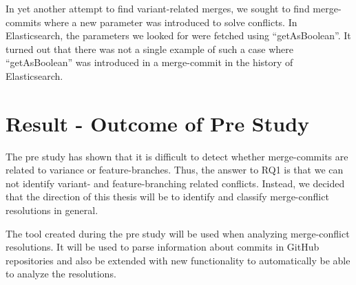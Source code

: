 In yet another attempt to find variant-related merges, we sought to find merge-commits where a new parameter was introduced to solve conflicts. In Elasticsearch, the parameters we looked for were fetched using “getAsBoolean”. It turned out that there was not a single example of such a case where “getAsBoolean” was introduced in a merge-commit in the history of Elasticsearch.

\section{Result - Outcome of Pre Study}
The pre study has shown that it is difficult to detect whether merge-commits are related to variance or feature-branches. Thus, the answer to RQ1 is that we can not identify variant- and feature-branching related conflicts. Instead, we decided that the direction of this thesis will be to identify and classify merge-conflict resolutions in general.

The tool created during the pre study will be used when analyzing merge-conflict resolutions. It will be used to parse information about commits in GitHub repositories and also be extended with new functionality to automatically be able to analyze the resolutions.
